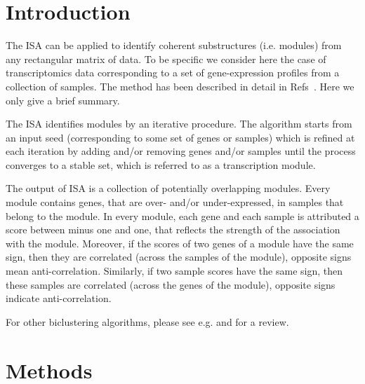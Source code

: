 \documentclass{bioinfo}
\begin{document}
\vspace{-0.7cm}
\section{Introduction}

The ISA can be applied to identify coherent substructures (i.e. modules)
from any rectangular matrix of data. To be specific we consider here the
case of transcriptomics data corresponding to a set of gene-expression
profiles from a collection of samples. The method has been described in
detail in Refs~\citep{isamod,isa}. Here we only give a brief summary.

The ISA identifies modules by an iterative procedure. The algorithm starts
from an input seed (corresponding to some set of genes or samples) which is
refined at each iteration by adding and/or removing genes and/or samples
until the process converges to a stable set, which is referred to as a
transcription module.

The output of ISA is a collection of potentially overlapping
modules. Every module contains genes, that are over- and/or
under-expressed, in samples that belong to the module.
In every module, each gene and each sample is attributed a
score between minus one and one, that reflects the strength of the
association with the module. Moreover, if the scores of two genes of a
module have the same sign, then they are correlated (across the
samples of the module), opposite signs mean
anti-correlation. Similarly, if two sample
scores have the same sign, then these samples are correlated (across
the genes of the module), opposite signs indicate anti-correlation.

For other biclustering algorithms, please see e.g.
\citet{cheng00,getz00,califano00,sharan02,tanay04,barkow06} and
\citet{ihmels04} for a review.

\section{Methods}%
\label{sec:methods}
\end{document}
